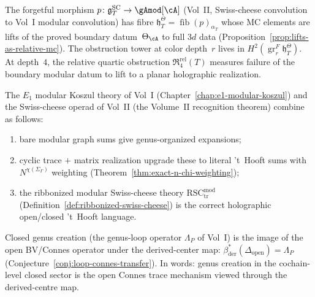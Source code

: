 \begin{proposition}%
\label{prop:vol2-relative-holographic-bridge}%
%
The forgetful morphism
$p\colon \mathfrak{g}^{\mathrm{SC}}_T \to \gAmod[\cA]$
(Vol~II, Swiss-cheese convolution to Vol~I modular
convolution) has fibre
$\mathfrak{h}_T^\Theta =
\operatorname{fib}(p)_{\alpha_T}$
whose MC elements are lifts of the proved boundary
datum~$\Theta_\cA$ to full $3d$ data
\textup{(}Proposition~\textup{\ref{prop:lifts-as-relative-mc}}\textup{)}.
The obstruction tower at color depth~$r$ lives in
$H^2(\operatorname{gr}^F_r \mathfrak{h}_T^\Theta)$.
At depth~$4$, the relative quartic obstruction
$\mathfrak{R}_4^{\mathrm{rel}}(T)$ measures failure
of the boundary modular datum to lift to a planar
holographic realization.
\end{proposition}

\begin{proposition}%
\label{prop:vol2-ribbon-thooft-bridge}%
%
%
The $E_1$ modular Koszul theory of Vol~I
\textup{(}Chapter~\textup{\ref{chap:e1-modular-koszul}}\textup{)}
and the Swiss-cheese operad of Vol~II
\textup{(}the Volume~II recognition theorem\textup{)}
combine as follows:
\begin{enumerate}[label=\textup{(\roman*)}]
\item bare modular graph sums give genus-organized
 expansions\textup;
\item cyclic trace $+$ matrix realization upgrade these
 to literal 't~Hooft sums with $N^{\chi(\Sigma_\Gamma)}$
 weighting
 \textup{(}Theorem~\textup{\ref{thm:exact-n-chi-weighting}}\textup{)}\textup;
\item the ribbonized modular Swiss-cheese theory
 $\mathrm{RSC}_{\mathrm{tr}}^{\mathrm{mod}}$
 \textup{(}Definition~\textup{\ref{def:ribbonized-swiss-cheese}}\textup{)}
 is the correct holographic open/closed 't~Hooft language.
\end{enumerate}
\end{proposition}

\begin{conjecture}%
\label{conj:vol2-loop-connes-bridge}%
%
Closed genus creation \textup{(}the genus-loop operator
$\Lambda_P$ of Vol~I\textup{)} is the image of the open
BV/Connes operator under the derived-center map:
$\beta_{\mathrm{der}}^*(\Delta_{\mathrm{open}})
= \Lambda_P$
\textup{(}Conjecture~\textup{\ref{conj:loop-connes-transfer}}\textup{)}.
In words: genus creation in the cochain-level closed sector is the
open Connes trace mechanism viewed through the derived-centre map.
\end{conjecture}

